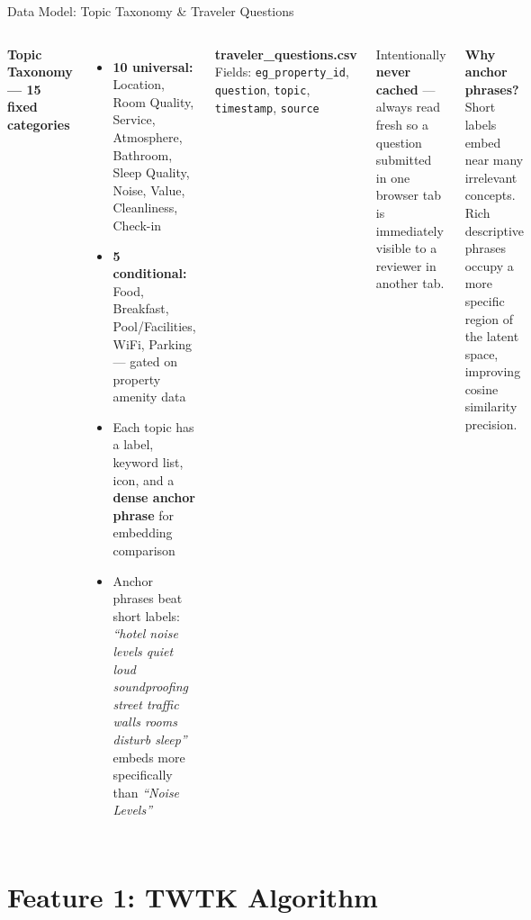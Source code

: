 \documentclass[aspectratio=169,10pt]{beamer}
\begin{document}
\begin{frame}{Data Model: Topic Taxonomy \& Traveler Questions}
\begin{columns}[T]
\textbf{Topic Taxonomy — 15 fixed categories}
\begin{itemize}
  \item \textbf{10 universal:} Location, Room Quality, Service,
        Atmosphere, Bathroom, Sleep Quality, Noise, Value,
        Cleanliness, Check-in
  \item \textbf{5 conditional:} Food, Breakfast, Pool/Facilities,
        WiFi, Parking — gated on property amenity data
  \item Each topic has a label, keyword list, icon, and a
        \textbf{dense anchor phrase} for embedding comparison
  \item Anchor phrases beat short labels: \textit{``hotel noise
        levels quiet loud soundproofing street traffic walls rooms
        disturb sleep''} embeds more specifically than
        \textit{``Noise Levels''}
\end{itemize}

\textbf{traveler\_questions.csv}\\[0.3em]
\small
Fields: \texttt{eg\_property\_id}, \texttt{question},
\texttt{topic}, \texttt{timestamp}, \texttt{source}

\medskip
Intentionally \textbf{never cached} — always read fresh so a question
submitted in one browser tab is immediately visible to a reviewer in
another tab.

\medskip
\textbf{Why anchor phrases?}
Short labels embed near many irrelevant concepts.
Rich descriptive phrases occupy a more specific region of the
latent space, improving cosine similarity precision.
\end{columns}
\end{frame}


\section{Feature 1: TWTK Algorithm}
\end{document}
